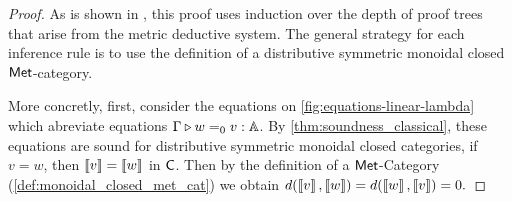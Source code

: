 \begin{proof}
  As is shown in \cite{dahlqvist2022syntactic}, this proof uses induction over the depth of proof trees that
  arise from the metric deductive system. The general strategy for each
  inference rule is to use the definition of a distributive symmetric monoidal closed $\mathsf{Met}$-category. 

   More concretly, first, consider the equations on \autoref{fig:equations-linear-lambda} which abreviate equations $\Gamma \triangleright w =_0 v : \mathbb{A}$. By \autoref{thm:soundness_classical}, these equations are sound for distributive symmetric monoidal closed categories, \ie if $v=w$, then $\left \llbracket v \right \rrbracket=\left \llbracket w \right \rrbracket$ in $ \mathsf{C}$. Then by the definition of a $\mathsf{Met}$-Category (\autoref{def:monoidal_closed_met_cat}) we obtain $d(\left \llbracket v \right \rrbracket,\left \llbracket w \right \rrbracket) = d(\left \llbracket w \right \rrbracket,\left \llbracket v \right \rrbracket)=0.$ 
 

\end{proof}
